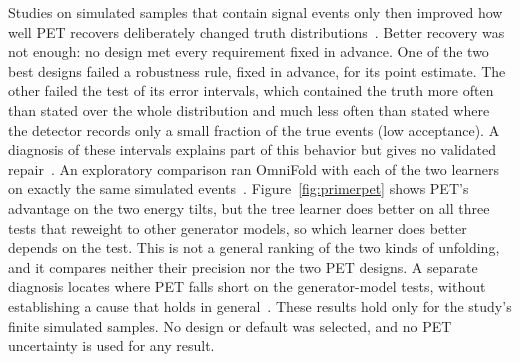 Studies on simulated samples that contain signal events only then improved how well PET recovers deliberately changed truth distributions~\cite{PETImprovement2026,PETFinalDesign2026}. Better recovery was not enough: no design met every requirement fixed in advance. One of the two best designs failed a robustness rule, fixed in advance, for its point estimate. The other failed the test of its error intervals, which contained the truth more often than stated over the whole distribution and much less often than stated where the detector records only a small fraction of the true events (low acceptance). A diagnosis of these intervals explains part of this behavior but gives no validated repair~\cite{PETIntervalDiagnosis2026}. An exploratory comparison ran OmniFold with each of the two learners on exactly the same simulated events~\cite{PETGBDT2026}. Figure~\ref{fig:primerpet} shows PET's advantage on the two energy tilts, but the tree learner does better on all three tests that reweight to other generator models, so which learner does better depends on the test. This is not a general ranking of the two kinds of unfolding, and it compares neither their precision nor the two PET designs. A separate diagnosis locates where PET falls short on the generator-model tests, without establishing a cause that holds in general~\cite{PETGeneratorDiagnosis2026}. These results hold only for the study's finite simulated samples. No design or default was selected, and no PET uncertainty is used for any result.

